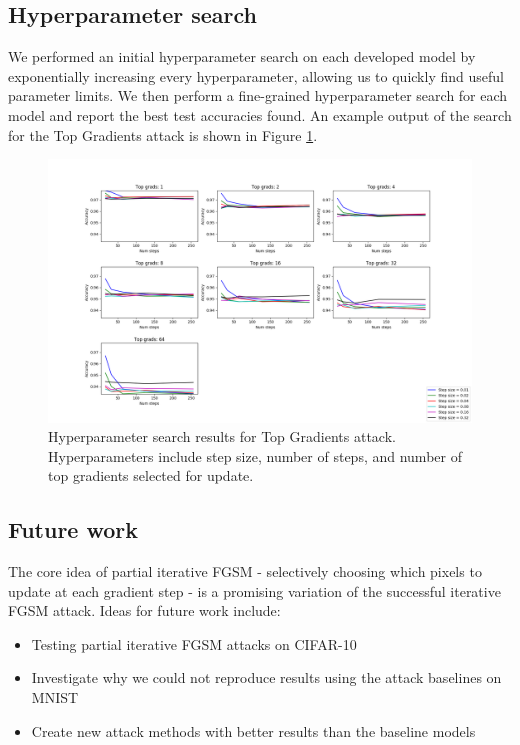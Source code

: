 \subsection{Hyperparameter search}
We performed an initial hyperparameter search on each developed model by exponentially increasing every hyperparameter, allowing us to quickly find useful parameter limits. We then perform a fine-grained hyperparameter search for each model and report the best test accuracies found. An example output of the search for the Top Gradients attack is shown in Figure \ref{fig:hyperparam_search}.

\begin{figure}
    \centering
    \includegraphics[width=\textwidth]{Report/sections/images/hyperparameter-search.png}
    \caption{Hyperparameter search results for Top Gradients attack. Hyperparameters include step size, number of steps, and number of top gradients selected for update.}
    \label{fig:hyperparam_search}
\end{figure}

\subsection{Future work}
The core idea of partial iterative FGSM - selectively choosing which pixels to update at each gradient step - is a promising variation of the successful iterative FGSM attack. Ideas for future work include: 

\begin{itemize}
\item Testing partial iterative FGSM attacks on CIFAR-10
\item Investigate why we could not reproduce results using the attack baselines on MNIST
\item Create new attack methods with better results than the baseline models

\end{itemize}
